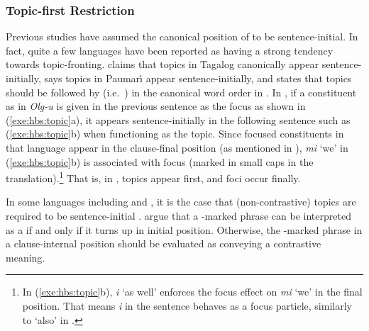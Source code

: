 \subsubsection{Topic-first Restriction}
\label{4:sssec:topic-first}

Previous studies have assumed the canonical position of  to be
sentence-initial. In fact, quite a few languages have been reported as
having a strong tendency towards topic-fronting.  \citet{nagaya:07}
claims that topics in Tagalog canonically appear sentence-initially,
\citet{chapman:81} says topics in Paumar{\'{\i}} appear
sentence-initially, and \citet{casielles:03} states that topics should
be followed by  (i.e.\ ) in the canonical word
order in . In , if a
constituent as in \textit{Olg-u} is given in the previous sentence as
the focus as shown in (\ref{exe:hbs:topic}a), it appears
sentence-initially in the following sentence such as
(\ref{exe:hbs:topic}b) when functioning as the topic.
Since focused constituents in that language appear in the clause-final
position (as mentioned in ), \textit{mi}
`we' in (\ref{exe:hbs:topic}b) is associated with focus (marked in
small caps in the translation).\footnote{In (\ref{exe:hbs:topic}b),
  \textit{i} `as well' enforces the focus effect on \textit{mi} `we'
  in the final position. That means \textit{i} in the sentence behaves
  as a focus particle, similarly to `also' in .} That is,
in , topics appear first, and foci occur
finally.






In some languages including  and , it is the
case that (non-contrastive) topics are required to be sentence-initial
\citep{maki:etal:99,vermeulen:09}.
\citeauthor{maki:etal:99} argue
that a \wa-marked phrase can be interpreted as a  if and only if
it turns up in initial position. Otherwise, the \wa-marked phrase in a
clause-internal position should be evaluated as conveying a
contrastive meaning.

